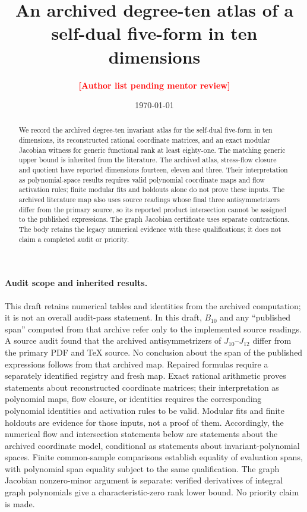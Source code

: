 \documentclass[
  aps,prd,
  reprint,
  letterpaper,
  amsmath,amssymb,
  nofootinbib,
  superscriptaddress
]{revtex4-2}
\theoremstyle{plain}
\newcommand{\pending}[1]{\textcolor{red}{\textbf{[#1]}}}
\begin{document}
\title{An archived degree-ten atlas of a self-dual five-form in ten dimensions}

\author{\pending{Author list pending mentor review}}
\affiliation{\pending{Affiliations pending mentor review}}

\date{\today}

\begin{abstract}
We record the archived degree-ten invariant atlas for the self-dual
five-form in ten dimensions, its reconstructed rational coordinate matrices,
and an exact modular Jacobian witness for generic functional rank at least
eighty-one. The matching generic upper bound is inherited from the literature.
The archived atlas, stress-flow closure and quotient have reported dimensions
fourteen, eleven and three. Their interpretation as polynomial-space results
requires valid polynomial coordinate maps and flow activation rules; finite
modular fits and holdouts alone do not prove these inputs. The archived
literature map also uses source readings whose final three antisymmetrizers
differ from the primary source, so its reported product intersection cannot
be assigned to the published expressions. The graph Jacobian certificate uses
separate contractions. The body retains the legacy numerical evidence with
these qualifications; it does not claim a completed audit or priority.
\end{abstract}

\maketitle

\paragraph{Audit scope and inherited results.}
This draft retains numerical tables and identities from the archived computation;
it is not an overall audit-pass statement. In this draft, $B_{10}$ and any
``published span'' computed from that archive refer only to the implemented
source readings. A source audit found that the archived antisymmetrizers of
$J_{10}$--$J_{12}$ differ from the primary PDF and TeX source. No conclusion
about the span of the published expressions follows from that archived map.
Repaired formulas require a separately identified registry and fresh map.
Exact rational arithmetic proves statements about reconstructed coordinate
matrices; their interpretation as polynomial maps, flow closure, or identities
requires the corresponding polynomial identities and activation rules to be
valid. Modular fits and finite holdouts are evidence for those inputs, not a
proof of them. Accordingly, the numerical flow and intersection statements
below are statements about the archived coordinate model, conditional as
statements about invariant-polynomial spaces. Finite common-sample comparisons
establish equality of evaluation spans, with polynomial span equality subject
to the same qualification. The graph Jacobian nonzero-minor argument is
separate: verified derivatives of integral graph polynomials give a
characteristic-zero rank lower bound. No priority claim is made.
\end{document}
